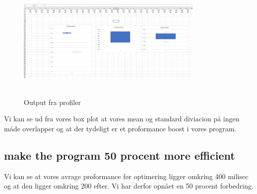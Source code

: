 \documentclass[12pt]{article}
\begin{document}
\begin{equation}
[202, 202, 202, 202, 202, 202, 202, 202, 202, 202, 202, 202, 202, 202, 202, 202, 202, 202, 202, 202, 202, 202, 202, 202, 202, 202, 202, 202, 202, 202, 202, 202, 202, 202, 202, 202, 202, 202, 202, 202, 202, 202, 202, 202, 202, 202, 202, 202, 202, 202, 202, 202, 203, 203, 203, 203, 203, 203, 203, 203, 203, 203, 203, 203, 203, 203, 203, 203, 203, 203, 203, 203, 203, 203, 203, 203, 203, 203, 203, 203, 203, 203, 203, 203, 203, 203, 203, 203, 203, 203, 203, 203, 203, 203, 203, 203, 203, 203, 203, 203]
\end{equation}

\begin{figure}[h!]
\begin{center}
\caption{Output fra profiler}
\includegraphics[width=9cm,height=5cm]{box plot.PNG}
\label{fig:cclogo}
\end{center}
\label{fig:firstFigureLabel}
\end{figure}


Vi kan se ud fra vores box plot at vores mean og standard diviacion på ingen måde overlapper og at der tydeligt er et proformance boost i vores program.  \\

\subsection{make the program 50 procent more efficient}


Vi kan se at vores avrage proformance før optimering ligger omkring 400 milisec
og at den ligger omkring 200 efter. Vi har derfor opnået en 50 procent forbedring.
\end{document}
